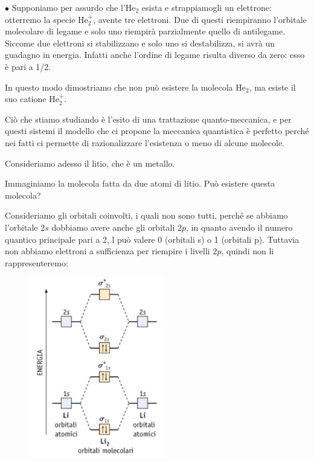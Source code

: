 \vspace{0.2cm}$\bullet$ Supponiamo per assurdo che l'He$_2$ esista e strappiamogli un elettrone: otterremo la specie He$_2^+$, avente tre elettroni. Due di questi riempiranno l'orbitale molecolare di legame e solo uno riempirà parzialmente quello di antilegame. Siccome due elettroni si stabilizzano e solo uno si destabilizza, si avrà un guadagno in energia. Infatti anche l'ordine di legame risulta diverso da zero: esso è pari a 1/2.

In questo modo dimostriamo che non può esistere la molecola He$_2$, ma esiste il suo catione He$_2^+$.

\vspace{0.2cm} Ciò che stiamo studiando è l'esito di una trattazione quanto-meccanica, e per questi sistemi il modello che ci propone la meccanica quantistica è perfetto perché nei fatti ci permette di razionalizzare l'esistenza o meno di alcune molecole.

\vspace{0.2cm}Consideriamo adesso il litio, che è un metallo.

Immaginiamo la molecola fatta da due atomi di litio. Può esistere questa molecola?

Consideriamo gli orbitali coinvolti, i quali non sono tutti, perché se abbiamo l'orbitale $2s$ dobbiamo avere anche gli orbitali $2p$, in quanto avendo il numero quantico principale pari a 2, l può valere 0 (orbitali s) o 1 (orbitali p). Tuttavia non abbiamo elettroni a sufficienza per riempire i livelli $2p$, quindi non li rappresenteremo:

\begin{figure}[htp]
    \centering
    \includegraphics[width=6cm]{immagini/orbitali_molecolari_Li_2.png}
\end{figure}

